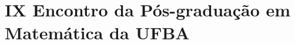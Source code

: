 \documentclass{hipatia}
\newcommand{\superou}{\textsuperscript{\underline{o}}~}
\begin{document}
 


 




\section{IX Encontro da Pós-graduação em Matemática da UFBA} %
%
%
%
%
\end{document}
